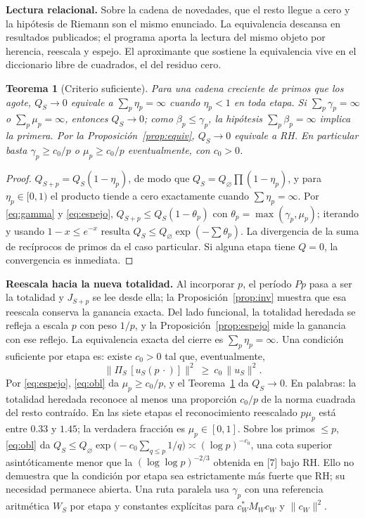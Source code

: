 \documentclass[11pt,a4paper]{article}
\theoremstyle{plain}
\newtheorem{teorema}{Teorema}
\begin{document}
\textbf{Lectura relacional.} Sobre la cadena de novedades, que el resto llegue a cero y la hipótesis de Riemann son el mismo enunciado. La equivalencia descansa en resultados publicados; el programa aporta la lectura del mismo objeto por herencia, reescala y espejo. El aproximante que sostiene la equivalencia vive en el diccionario libre de cuadrados, el del residuo cero.


\begin{teorema}[Criterio suficiente]\label{teo:cierre}
Para una cadena creciente de primos que los agote, $Q_S\to0$ equivale a $\sum_p\eta_p=\infty$ cuando $\eta_p<1$ en toda etapa. Si $\sum_p\gamma_p=\infty$ o $\sum_p\mu_p=\infty$, entonces $Q_S\to0$; como $\beta_p\le\gamma_p$, la hipótesis $\sum_p\beta_p=\infty$ implica la primera. Por la Proposición~\ref{prop:equiv}, $Q_S\to0$ equivale a RH. En particular basta $\gamma_p\ge c_0/p$ o $\mu_p\ge c_0/p$ eventualmente, con $c_0>0$.
\end{teorema}

\begin{proof}
$Q_{S+p}=Q_S(1-\eta_p)$, de modo que $Q_S=Q_\varnothing\prod(1-\eta_p)$, y para $\eta_p\in[0,1)$ el producto tiende a cero exactamente cuando $\sum\eta_p=\infty$. Por \eqref{eq:gamma} y \eqref{eq:espejo}, $Q_{S+p}\le Q_S(1-\theta_p)$ con $\theta_p=\max(\gamma_p,\mu_p)$; iterando y usando $1-x\le e^{-x}$ resulta $Q_S\le Q_\varnothing\exp(-\sum\theta_p)$. La divergencia de la suma de recíprocos de primos da el caso particular. Si alguna etapa tiene $Q=0$, la convergencia es inmediata.
\end{proof}

\textbf{Reescala hacia la nueva totalidad.} Al incorporar $p$, el período $Pp$ pasa a ser la totalidad y $J_{S+p}$ se lee desde ella; la Proposición~\ref{prop:inv} muestra que esa reescala conserva la ganancia exacta. Del lado funcional, la totalidad heredada se refleja a escala $p$ con peso $1/p$, y la Proposición~\ref{prop:espejo} mide la ganancia con ese reflejo. La equivalencia exacta del cierre es $\sum_p\eta_p=\infty$. Una condición suficiente por etapa es: existe $c_0>0$ tal que, eventualmente,
\begin{equation}\label{eq:obl}
\bigl\|\Pi_S\,[u_S(p\,\cdot)]\bigr\|^2\ \ge\ c_0\,\|u_S\|^2 .
\end{equation}
Por \eqref{eq:espejo}, \eqref{eq:obl} da $\mu_p\ge c_0/p$, y el Teorema~\ref{teo:cierre} da $Q_S\to0$. En palabras: la totalidad heredada reconoce al menos una proporción $c_0/p$ de la norma cuadrada del resto contraído. En las siete etapas el reconocimiento reescalado $p\mu_p$ está entre $0.33$ y $1.45$; la verdadera fracción es $\mu_p\in[0,1]$. Sobre los primos $\le p$, \eqref{eq:obl} da $Q_S\le Q_\varnothing\exp\bigl(-c_0\sum_{q\le p}1/q\bigr)\asymp(\log p)^{-c_0}$, una cota superior asintóticamente menor que la $(\log\log p)^{-2/3}$ obtenida en [7] bajo RH. Ello no demuestra que la condición por etapa sea estrictamente más fuerte que RH; su necesidad permanece abierta. Una ruta paralela usa $\gamma_p$ con una referencia aritmética $W_S$ por etapa y constantes explícitas para $c_W^*M_Wc_W$ y $\|c_W\|^2$.
\end{document}
